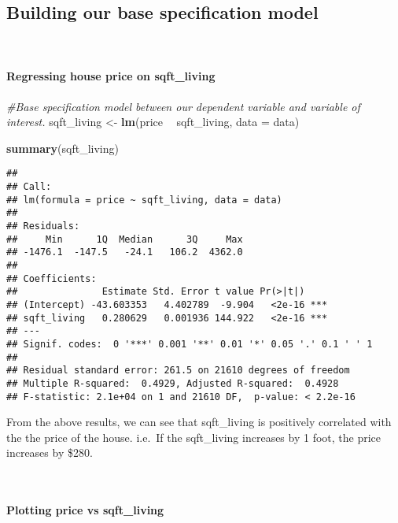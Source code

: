 \documentclass[
]{article}
\newenvironment{Shaded}{\begin{snugshade}}{\end{snugshade}}
\newcommand{\CommentTok}[1]{\textcolor[rgb]{0.56,0.35,0.01}{\textit{#1}}}
\newcommand{\DataTypeTok}[1]{\textcolor[rgb]{0.13,0.29,0.53}{#1}}
\newcommand{\KeywordTok}[1]{\textcolor[rgb]{0.13,0.29,0.53}{\textbf{#1}}}
\newcommand{\NormalTok}[1]{#1}
\newcommand{\OperatorTok}[1]{\textcolor[rgb]{0.81,0.36,0.00}{\textbf{#1}}}
\newcommand{\StringTok}[1]{\textcolor[rgb]{0.31,0.60,0.02}{#1}}
\begin{document}
\hypertarget{building-our-base-specification-model}{%
\subsection{Building our base specification
model}\label{building-our-base-specification-model}}

~

\hypertarget{regressing-house-price-on-sqft_living}{%
\paragraph{Regressing house price on
sqft\_living}\label{regressing-house-price-on-sqft_living}}

\begin{Shaded}
\begin{Highlighting}[]
\CommentTok{#Base specification model between our dependent variable and variable of interest.}
\NormalTok{sqft_living <-}\StringTok{ }\KeywordTok{lm}\NormalTok{(price }\OperatorTok{~}\StringTok{ }\NormalTok{sqft_living, }\DataTypeTok{data =}\NormalTok{ data)}

\KeywordTok{summary}\NormalTok{(sqft_living)}
\end{Highlighting}
\end{Shaded}

\begin{verbatim}
## 
## Call:
## lm(formula = price ~ sqft_living, data = data)
## 
## Residuals:
##     Min      1Q  Median      3Q     Max 
## -1476.1  -147.5   -24.1   106.2  4362.0 
## 
## Coefficients:
##               Estimate Std. Error t value Pr(>|t|)    
## (Intercept) -43.603353   4.402789  -9.904   <2e-16 ***
## sqft_living   0.280629   0.001936 144.922   <2e-16 ***
## ---
## Signif. codes:  0 '***' 0.001 '**' 0.01 '*' 0.05 '.' 0.1 ' ' 1
## 
## Residual standard error: 261.5 on 21610 degrees of freedom
## Multiple R-squared:  0.4929, Adjusted R-squared:  0.4928 
## F-statistic: 2.1e+04 on 1 and 21610 DF,  p-value: < 2.2e-16
\end{verbatim}

From the above results, we can see that sqft\_living is positively
correlated with the the price of the house. i.e.~If the sqft\_living
increases by 1 foot, the price increases by \$280.

~

\hypertarget{plotting-price-vs-sqft_living}{%
\paragraph{Plotting price vs
sqft\_living}\label{plotting-price-vs-sqft_living}}
\end{document}
